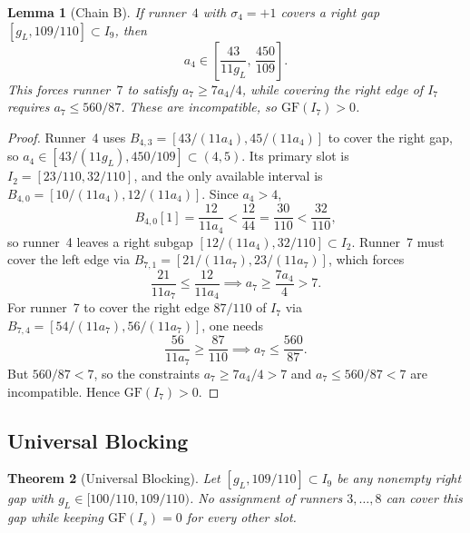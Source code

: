 \documentclass[12pt,a4paper]{amsart}
\newtheorem{theorem}{Theorem}[section]
\newtheorem{lemma}[theorem]{Lemma}
\theoremstyle{definition}
\theoremstyle{remark}
\newcommand{\GF}{\mathrm{GF}}
\begin{document}
\begin{lemma}[Chain B]\label{lem:chainB}
If runner~$4$ with $\sigma_4=+1$ covers a right gap $[g_L,109/110]\subset I_9$, then
\[
  a_4 \in \left[\frac{43}{11g_L},\,\frac{450}{109}\right].
\]
This forces runner~$7$ to satisfy $a_7\ge 7a_4/4$, while covering the right edge of $I_7$
requires $a_7\le 560/87$. These are incompatible, so $\GF(I_7)>0$.
\end{lemma}

\begin{proof}
Runner~4 uses $B_{4,3}=[43/(11a_4),45/(11a_4)]$ to cover the right gap, so
$a_4\in[43/(11g_L),450/109]\subset(4,5)$. Its primary slot is $I_2=[23/110,32/110]$, and
the only available interval is $B_{4,0}=[10/(11a_4),12/(11a_4)]$. Since $a_4>4$,
\[
  B_{4,0}[1] = \frac{12}{11a_4} < \frac{12}{44} = \frac{30}{110} < \frac{32}{110},
\]
so runner~4 leaves a right subgap $[12/(11a_4),32/110]\subset I_2$. Runner~7 must cover
the left edge via $B_{7,1}=[21/(11a_7),23/(11a_7)]$, which forces
\[
  \frac{21}{11a_7} \le \frac{12}{11a_4} \implies a_7 \ge \frac{7a_4}{4} > 7.
\]
For runner~7 to cover the right edge $87/110$ of $I_7$
via $B_{7,4}=[54/(11a_7),56/(11a_7)]$, one needs
\[
  \frac{56}{11a_7} \ge \frac{87}{110} \implies a_7 \le \frac{560}{87}.
\]
But $560/87<7$, so the constraints $a_7\ge 7a_4/4>7$
and $a_7\le 560/87<7$ are incompatible. Hence $\GF(I_7)>0$.
\end{proof}

\subsection{Universal Blocking}

\begin{theorem}[Universal Blocking]\label{thm:ub}
Let $[g_L,109/110]\subset I_9$ be any nonempty right gap with $g_L\in[100/110,109/110)$.
No assignment of runners $3,\ldots,8$ can cover this gap while keeping $\GF(I_s)=0$ for
every other slot.
\end{theorem}
\end{document}

